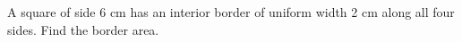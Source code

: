 A square of side 6 cm has an interior border of uniform width 2 cm along all four sides. Find the border area.
